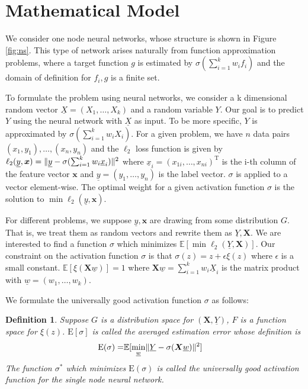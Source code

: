 \documentclass[conference]{IEEEtran}
\newtheorem{definition}{Definition}
\DeclarePairedDelimiter\norm{\lVert}{\rVert}
\def\E{\mathbb{E}}
\def\T{\mathrm{T}}
\begin{document}
\section{Mathematical Model}\label{sec:mm}
We consider one node neural networks, whose structure is shown in Figure \ref{fig:ns}.
This type of network arises naturally from function approximation problems, where a target function $g$
is estimated by $\sigma(\sum_{i=1}^k w_i f_i)$ and the domain of definition for $f_i, g$ is a finite set.

To formulate the problem using neural networks, we consider a k dimensional random vector $\underline{X}=(X_1, \dots, X_k)$ and a random variable $Y$.
Our goal is to predict $Y$ using the neural network with $\underline{X}$ as input.
To be more specific, $Y$ is approximated by $ \sigma(\sum_{i=1}^k w_i X_i)$.
For a given problem, we have $n$ data pairs $(x_1, y_1), \dots, (x_n, y_n)$ and
the $\ell_2$ loss function is given by
$\ell_2(\underline{y}, \bm{x}) = \norm{\underline{y} - \sigma(\sum_{i=1}^k w_i \underline{x}_i)}^2 $
where $\underline{x}_i= (x_{1i}, \dots, x_{ni})^\T$ is the i-th column of the feature vector $\bm{x}$ and
$\underline{y} = (y_1, \dots, y_n)$ is the label vector. $\sigma$ is applied to a vector element-wise.
The optimal weight for a given activation function $\sigma$ is the solution to $\min \ell_2(\underline{y}, \bm{x})$.



For different problems, we suppose $\underline{y}, \bm{x}$ are drawing from some distribution $G$.
That is, we treat them as random vectors and rewrite them as $\underline{Y}, \bm{X}$.
We are interested to find a function $\sigma$ which minimizes
$\E[ \min \ell_2(\underline{Y}, \bm{X})]$.
Our constraint on the activation function $\sigma$ is that
$\sigma(z) = z + \epsilon \xi(z)$ where
$\epsilon$ is a small constant.
$\E[\xi(\bm{X}\underline{w})]=1$ where
$\bm{X}\underline{w} = \sum_{i=1}^k w_i \underline{X}_i$ is the matrix product with  $\underline{w}=(w_1, \dots, w_k)$.

We formulate the universally good activation function $\sigma$ as follows:
\begin{definition}\label{def:ug}
Suppose $G$ is a distribution space for $(\bm{X}, \underline{Y})$,
$F$ is a function space for $\xi(z)$.
$\mathrm{E}[\sigma]$ is called the averaged estimation error whose definition is
\begin{align}\label{eq:ug}
\mathrm{E}(\sigma) = & \E[ \min_{\underline{w}} \norm{\underline{Y} - \sigma(\bm{X} \underline{w})}^2] 
\end{align}
The function $\sigma^*$ which minimizes $\mathrm{E}(\sigma)$
is called the universally good activation function for the single node neural network.
\end{definition}
\end{document}
